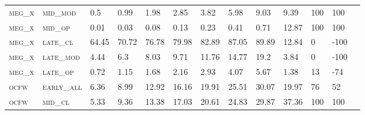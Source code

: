 \begin{sidewaystable}[!htbp]
\begin{tabular}{@{}lllllllllllll@{}}
\footnotesize \textsc{meg\_x}      & \footnotesize \textsc{mid\_mod  }                & \footnotesize 0.5             & \footnotesize 0.99            & \footnotesize 1.98             & \footnotesize 2.85             & \footnotesize 3.82             & \footnotesize 5.98             & \footnotesize 9.03       & \footnotesize 9.39     & \footnotesize 100    & \footnotesize 100      \\
\footnotesize \textsc{meg\_x}      & \footnotesize \textsc{mid\_op   }                & \footnotesize 0.01            & \footnotesize 0.03            & \footnotesize 0.08             & \footnotesize 0.13             & \footnotesize 0.23             & \footnotesize 0.41             & \footnotesize 0.71       & \footnotesize 12.87    & \footnotesize 100    & \footnotesize 100      \\
\footnotesize \textsc{meg\_x}      & \footnotesize \textsc{late\_cl  }                & \footnotesize 64.45           & \footnotesize 70.72           & \footnotesize 76.78            & \footnotesize 79.98            & \footnotesize 82.89            & \footnotesize 87.05            & \footnotesize 89.89      & \footnotesize 12.84    & \footnotesize 0      & \footnotesize -100     \\
\footnotesize \textsc{meg\_x}      & \footnotesize \textsc{late\_mod }                & \footnotesize 4.44            & \footnotesize 6.3             & \footnotesize 8.03             & \footnotesize 9.71             & \footnotesize 11.76            & \footnotesize 14.77            & \footnotesize 19.2       & \footnotesize 3.84     & \footnotesize 0      & \footnotesize -100     \\
\footnotesize \textsc{meg\_x}      & \footnotesize \textsc{late\_op  }                & \footnotesize 0.72            & \footnotesize 1.15            & \footnotesize 1.68             & \footnotesize 2.16             & \footnotesize 2.93             & \footnotesize 4.07             & \footnotesize 5.67       & \footnotesize 1.38     & \footnotesize 13     & \footnotesize -74      \\
\footnotesize \textsc{ocfw}        & \footnotesize \textsc{early\_all}                & \footnotesize 6.36            & \footnotesize 8.99            & \footnotesize 12.92            & \footnotesize 16.16            & \footnotesize 19.91            & \footnotesize 25.51            & \footnotesize 30.07      & \footnotesize 19.97    & \footnotesize 76     & \footnotesize 52       \\
\footnotesize \textsc{ocfw}        & \footnotesize \textsc{mid\_cl   }                & \footnotesize 5.33            & \footnotesize 9.36            & \footnotesize 13.38            & \footnotesize 17.03            & \footnotesize 20.61            & \footnotesize 24.83            & \footnotesize 29.87      & \footnotesize 37.36    & \footnotesize 100    & \footnotesize 100      \\

\end{tabular}
\end{sidewaystable}
